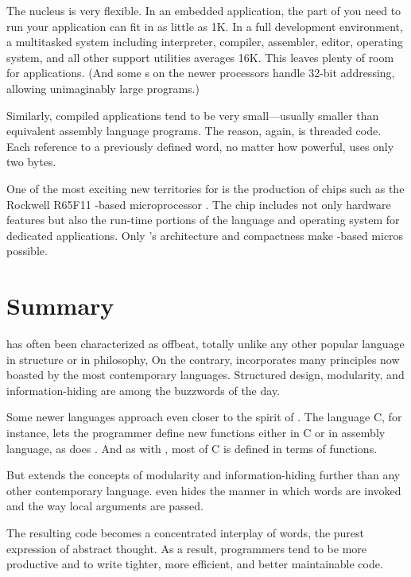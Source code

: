 The \Forth{} nucleus is very flexible. In an embedded application, the
part of \Forth{} you need to run your application can fit in as little
as 1K. In a full development environment, a multitasked \Forth{} system
including interpreter, compiler, assembler,%
editor, operating system, and all other support utilities averages
16K. This leaves plenty of room for applications. (And some \Forth{}s on
the newer processors handle 32-bit addressing, allowing unimaginably
large programs.)

Similarly, \Forth{} compiled applications tend to be very small---usually
smaller than equivalent assembly language programs. The reason, again,
is threaded code. Each reference to a previously defined word, no
matter how powerful, uses only two bytes.

One of the most exciting new territories for \Forth{} is the production
of \Forth{} chips such as the
Rockwell R65F11 \Forth{}-based microprocessor%
\cite{dumse}. The chip includes not only hardware features but also
the run-time portions of the \Forth{} language and operating system for
dedicated applications. Only \Forth{}'s architecture and compactness make
\Forth{}-based micros possible.%
%
%


\section{Summary}
\Forth{} has often been characterized as offbeat, totally unlike any
other popular language in structure or in philosophy, On the contrary,
\Forth{} incorporates many principles now boasted by the most
contemporary languages. Structured design, modularity, and
information-hiding are among the buzzwords of the day.

Some newer languages approach even closer to the spirit of \Forth{}.  The
language C, for instance, lets the programmer define new functions
either in C or in assembly language, as does \Forth{}. And as with \Forth{},
most of C is defined in terms of functions.

But \Forth{} extends the concepts of modularity and information-hiding
further than any other contemporary language. \Forth{} even hides the
manner in which words are invoked and the way local arguments are
passed.

The resulting code becomes a concentrated interplay of words, the
purest expression of abstract thought. As a result, \Forth{} programmers
tend to be more productive and to write tighter, more efficient, and
better maintainable code.

